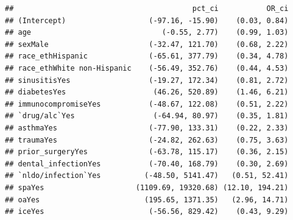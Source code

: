 \documentclass[
]{article}
\begin{document}
\begin{verbatim}
##                                         pct_ci           OR_ci
## (Intercept)                   (-97.16, -15.90)    (0.03, 0.84)
## age                              (-0.55, 2.77)    (0.99, 1.03)
## sexMale                       (-32.47, 121.70)    (0.68, 2.22)
## race_ethHispanic              (-65.61, 377.79)    (0.34, 4.78)
## race_ethWhite non-Hispanic    (-56.49, 352.76)    (0.44, 4.53)
## sinusitisYes                  (-19.27, 172.34)    (0.81, 2.72)
## diabetesYes                    (46.26, 520.89)    (1.46, 6.21)
## immunocompromiseYes           (-48.67, 122.08)    (0.51, 2.22)
## `drug/alc`Yes                  (-64.94, 80.97)    (0.35, 1.81)
## asthmaYes                     (-77.90, 133.31)    (0.22, 2.33)
## traumaYes                     (-24.82, 262.63)    (0.75, 3.63)
## prior_surgeryYes              (-63.78, 115.17)    (0.36, 2.15)
## dental_infectionYes           (-70.40, 168.79)    (0.30, 2.69)
## `nldo/infection`Yes          (-48.50, 5141.47)   (0.51, 52.41)
## spaYes                     (1109.69, 19320.68) (12.10, 194.21)
## oaYes                        (195.65, 1371.35)   (2.96, 14.71)
## iceYes                        (-56.56, 829.42)    (0.43, 9.29)
\end{verbatim}
\end{document}
